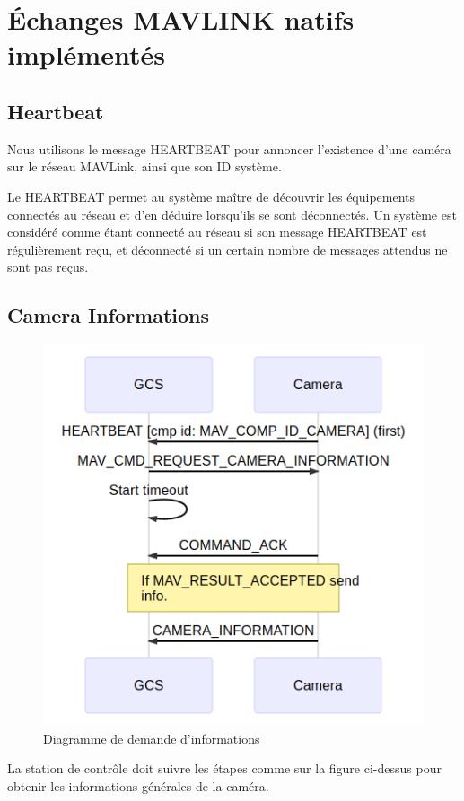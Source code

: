 \section{Échanges MAVLINK natifs implémentés}
\subsection{Heartbeat}
Nous utilisons le message HEARTBEAT pour annoncer l'existence d'une caméra sur le réseau MAVLink, ainsi que son ID système.

Le HEARTBEAT permet au système maître de découvrir les équipements connectés au réseau et d'en déduire lorsqu'ils se sont déconnectés. Un système est considéré comme étant connecté au réseau si son message HEARTBEAT est régulièrement reçu, et déconnecté si un certain nombre de messages attendus ne sont pas reçus.

\subsection{Camera Informations}
\begin{figure}[ht]
    \centering
    \includegraphics[scale=0.65]{img/camera_informations.png}
    \caption{Diagramme de demande d'informations}
    \label{fig:CameraCmdInfoExch}
\end{figure}

La station de contrôle doit suivre les étapes comme sur la figure ci-dessus pour obtenir les informations générales de la caméra. 

